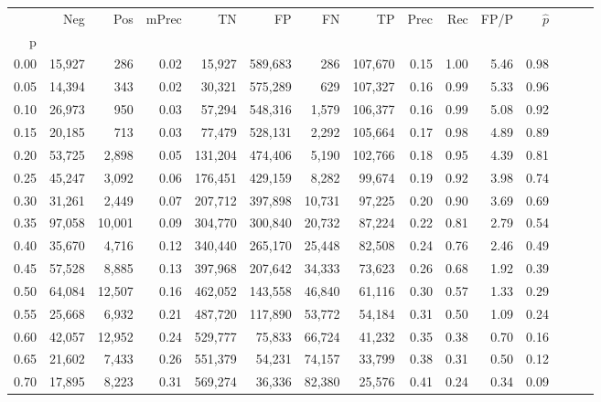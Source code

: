 \begin{tabular}{rrrrrrrrrrrrrrr}
\toprule
{} &     Neg &     Pos & mPrec &       TN &       FP &       FN &       TP &  Prec &   Rec &  FP/P & $\hat{p}$ \\
p    &         &         &       &          &          &          &          &       &       &       &           \\
\midrule
0.00 &  15,927 &     286 &  0.02 &   15,927 &  589,683 &      286 &  107,670 &  0.15 &  1.00 &  5.46 &      0.98 \\
0.05 &  14,394 &     343 &  0.02 &   30,321 &  575,289 &      629 &  107,327 &  0.16 &  0.99 &  5.33 &      0.96 \\
0.10 &  26,973 &     950 &  0.03 &   57,294 &  548,316 &    1,579 &  106,377 &  0.16 &  0.99 &  5.08 &      0.92 \\
0.15 &  20,185 &     713 &  0.03 &   77,479 &  528,131 &    2,292 &  105,664 &  0.17 &  0.98 &  4.89 &      0.89 \\
0.20 &  53,725 &   2,898 &  0.05 &  131,204 &  474,406 &    5,190 &  102,766 &  0.18 &  0.95 &  4.39 &      0.81 \\
0.25 &  45,247 &   3,092 &  0.06 &  176,451 &  429,159 &    8,282 &   99,674 &  0.19 &  0.92 &  3.98 &      0.74 \\
0.30 &  31,261 &   2,449 &  0.07 &  207,712 &  397,898 &   10,731 &   97,225 &  0.20 &  0.90 &  3.69 &      0.69 \\
0.35 &  97,058 &  10,001 &  0.09 &  304,770 &  300,840 &   20,732 &   87,224 &  0.22 &  0.81 &  2.79 &      0.54 \\
0.40 &  35,670 &   4,716 &  0.12 &  340,440 &  265,170 &   25,448 &   82,508 &  0.24 &  0.76 &  2.46 &      0.49 \\
0.45 &  57,528 &   8,885 &  0.13 &  397,968 &  207,642 &   34,333 &   73,623 &  0.26 &  0.68 &  1.92 &      0.39 \\
0.50 &  64,084 &  12,507 &  0.16 &  462,052 &  143,558 &   46,840 &   61,116 &  0.30 &  0.57 &  1.33 &      0.29 \\
0.55 &  25,668 &   6,932 &  0.21 &  487,720 &  117,890 &   53,772 &   54,184 &  0.31 &  0.50 &  1.09 &      0.24 \\
0.60 &  42,057 &  12,952 &  0.24 &  529,777 &   75,833 &   66,724 &   41,232 &  0.35 &  0.38 &  0.70 &      0.16 \\
0.65 &  21,602 &   7,433 &  0.26 &  551,379 &   54,231 &   74,157 &   33,799 &  0.38 &  0.31 &  0.50 &      0.12 \\
0.70 &  17,895 &   8,223 &  0.31 &  569,274 &   36,336 &   82,380 &   25,576 &  0.41 &  0.24 &  0.34 &      0.09 \\

\end{tabular}
